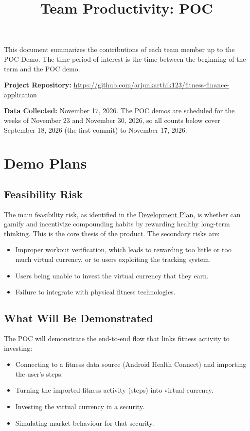 \documentclass{article}
\title{Team Productivity: POC\\\progname}
\author{\authname}
\date{}
\begin{document}
\maketitle

This document summarizes the contributions of each team member up to the POC
Demo.  The time period of interest is the time between the beginning of the term
and the POC demo.

\noindent \textbf{Project Repository:}
\url{https://github.com/arjunkarthik123/fitness-finance-application}

\noindent \textbf{Data Collected:} November 17, 2026. The POC demos are
scheduled for the weeks of November 23 and November 30, 2026, so all counts
below cover September 18, 2026 (the first commit) to November 17, 2026.

\section{Demo Plans}

\subsection*{Feasibility Risk}

The main feasibility risk, as identified in the
\href{https://github.com/arjunkarthik123/fitness-finance-application/blob/main/pdfs/DevelopmentPlan/DevelopmentPlan.pdf}{Development
Plan}, is whether \progname{} can gamify and incentivize compounding habits by
rewarding healthy long-term thinking. This is the core thesis of the product.
The secondary risks are:
\begin{itemize}
    \item Improper workout verification, which leads to rewarding too little or
    too much virtual currency, or to users exploiting the tracking system.
    \item Users being unable to invest the virtual currency that they earn.
    \item Failure to integrate with physical fitness technologies.
\end{itemize}

\subsection*{What Will Be Demonstrated}

The POC will demonstrate the end-to-end flow that links fitness activity to
investing:
\begin{itemize}
    \item Connecting to a fitness data source (Android Health Connect) and
    importing the user's steps.
    \item Turning the imported fitness activity (steps) into virtual currency.
    \item Investing the virtual currency in a security.
    \item Simulating market behaviour for that security.
\end{itemize}
\end{document}
